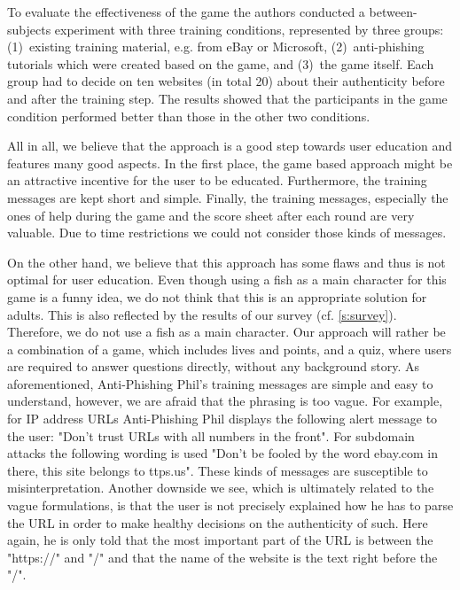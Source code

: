 \begin{description}[leftmargin=0cm]
\item[Game Evaluation:] To evaluate the effectiveness of the game the authors conducted a between-subjects experiment with three training conditions, represented by three groups: 
(1)~existing training material, e.g. from eBay or Microsoft, (2)~anti-phishing tutorials which were created based on the game, and (3)~the game itself. 
Each group had to decide on ten websites (in total 20) about their authenticity before and after the training step. 
The results showed that the participants in the game condition performed better than those in the other two conditions. 
\item[Positive Sides:] 
All in all, we believe that the approach is a good step towards user education and features many good aspects. 
In the first place, the game based approach might be an attractive incentive for the user to be educated. 
Furthermore, the training messages are kept short and simple. 
Finally, the training messages, especially the ones of help during the game and the score sheet after each round are very valuable. 
Due to time restrictions we could not consider those kinds of messages. 
\item[Downsides and Our Contributions:] 
On the other hand, we believe that this approach has some flaws and thus is not optimal for user education. 
Even though using a fish as a main character for this game is a funny idea, we do not think that this is an appropriate solution for adults. 
This is also reflected by the results of our survey (cf. \autoref{s:survey}). 
Therefore, we do not use a fish as a main character. 
Our approach will rather be a combination of a game, which includes lives and points, and a quiz, where users are required to answer questions directly, without any background story.
As aforementioned, Anti-Phishing Phil's training messages are simple and easy to understand, however, we are afraid that the phrasing is too vague. 
For example, for IP address URLs Anti-Phishing Phil displays the following alert message to the user: 
"Don't trust URLs with all numbers in the front". 
For subdomain attacks the following wording is used "Don't be fooled by the word ebay.com in there, this site belongs to ttps.us". 
These kinds of messages are susceptible to misinterpretation. 
Another downside we see, which is ultimately related to the vague formulations, is that the user is not precisely explained how he has to parse the URL in order to make healthy decisions on the authenticity of such. 
Here again, he is only told that the most important part of the URL is between the "https://" and "/" and that the name of the website is the text right before the "/". 

\end{description}

